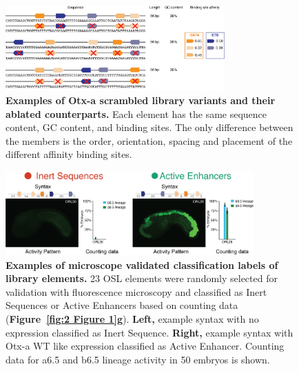 \begin{figure}[p]
    \centering
    \includegraphics[width=0.75\textwidth]{2_figures-and-files/SuppFig2.png}
    \caption[Examples of Otx-a scrambled library variants and their ablated counterparts.]{\textbf{Examples of Otx-a scrambled library variants and their ablated counterparts.} Each element has the same sequence content, GC content, and binding sites. The only difference between the members is the order, orientation, spacing and placement of the different affinity binding sites.}
    \label{fig:2 supplementary_2}
\end{figure}

\begin{figure}[p]
    \centering
    \includegraphics[width=0.85\textwidth]{2_figures-and-files/SuppFig3.png}
    \caption[Examples of microscope validated classification labels of library elements.]{\textbf{Examples of microscope validated classification labels of library elements.} 23 OSL elements were randomly selected for validation with fluorescence microscopy and classified as Inert Sequences or Active Enhancers based on counting data (\textbf{Figure~\ref{fig:2 Figure 1}g}). \textbf{Left,} example syntax with no expression classified as Inert Sequence. \textbf{Right,} example syntax with Otx-a WT like expression classified as Active Enhancer. Counting data for a6.5 and b6.5 lineage activity in 50 embryos is shown.}
    \label{fig:2 supplementary_3}
\end{figure}

